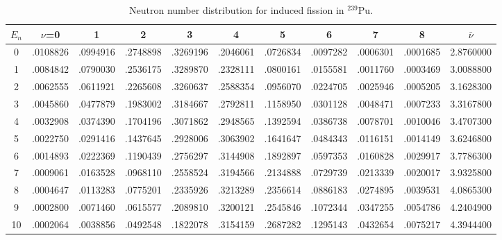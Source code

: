 \begin{table}[ht]
\footnotesize
\begin{center}
\begin{tabular}{|c|ccccccccc|c|} \hline
$E_n$ & $\nu$=0 & 1 & 2 & 3 & 4 & 5 & 6 & 7 & 8 & $\bar{\nu}$ \\ \hline
0 & .0108826 & .0994916 & .2748898 & .3269196 & .2046061 & .0726834 & .0097282 & .0006301 & .0001685 & 2.8760000 \\
1 & .0084842 & .0790030 & .2536175 & .3289870 & .2328111 & .0800161 & .0155581 & .0011760 & .0003469 & 3.0088800 \\
2 & .0062555 & .0611921 & .2265608 & .3260637 & .2588354 & .0956070 & .0224705 & .0025946 & .0005205 & 3.1628300 \\
3 & .0045860 & .0477879 & .1983002 & .3184667 & .2792811 & .1158950 & .0301128 & .0048471 & .0007233 & 3.3167800 \\
4 & .0032908 & .0374390 & .1704196 & .3071862 & .2948565 & .1392594 & .0386738 & .0078701 & .0010046 & 3.4707300 \\
5 & .0022750 & .0291416 & .1437645 & .2928006 & .3063902 & .1641647 & .0484343 & .0116151 & .0014149 & 3.6246800 \\
6 & .0014893 & .0222369 & .1190439 & .2756297 & .3144908 & .1892897 & .0597353 & .0160828 & .0029917 & 3.7786300 \\
7 & .0009061 & .0163528 & .0968110 & .2558524 & .3194566 & .2134888 & .0729739 & .0213339 & .0020017 & 3.9325800 \\
8 & .0004647 & .0113283 & .0775201 & .2335926 & .3213289 & .2356614 & .0886183 & .0274895 & .0039531 & 4.0865300 \\
9 & .0002800 & .0071460 & .0615577 & .2089810 & .3200121 & .2545846 & .1072344 & .0347255 & .0054786 & 4.2404900 \\
10& .0002064 & .0038856 & .0492548 & .1822078 & .3154159 & .2687282 & .1295143 & .0432654 & .0075217 & 4.3944400 \\ \hline
\end{tabular}
\end{center}
\caption{Neutron number distribution for induced fission in $^{239}$Pu.}
\label{Neutron number distribution for induced fission in 239Pu}
\end{table}


